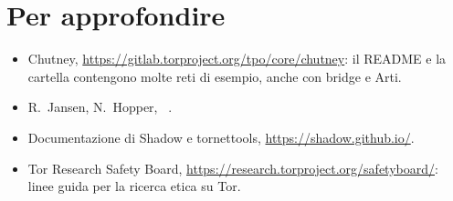 \section*{Per approfondire}
\begin{itemize}
  \item Chutney, \url{https://gitlab.torproject.org/tpo/core/chutney}: il README e la cartella  contengono molte reti di esempio, anche con bridge e Arti.
  \item R.~Jansen, N.~Hopper, ~\cite{jansen2012shadow}.
  \item Documentazione di Shadow e tornettools, \url{https://shadow.github.io/}.
  \item Tor Research Safety Board, \url{https://research.torproject.org/safetyboard/}: linee guida per la ricerca etica su Tor.
\end{itemize}
